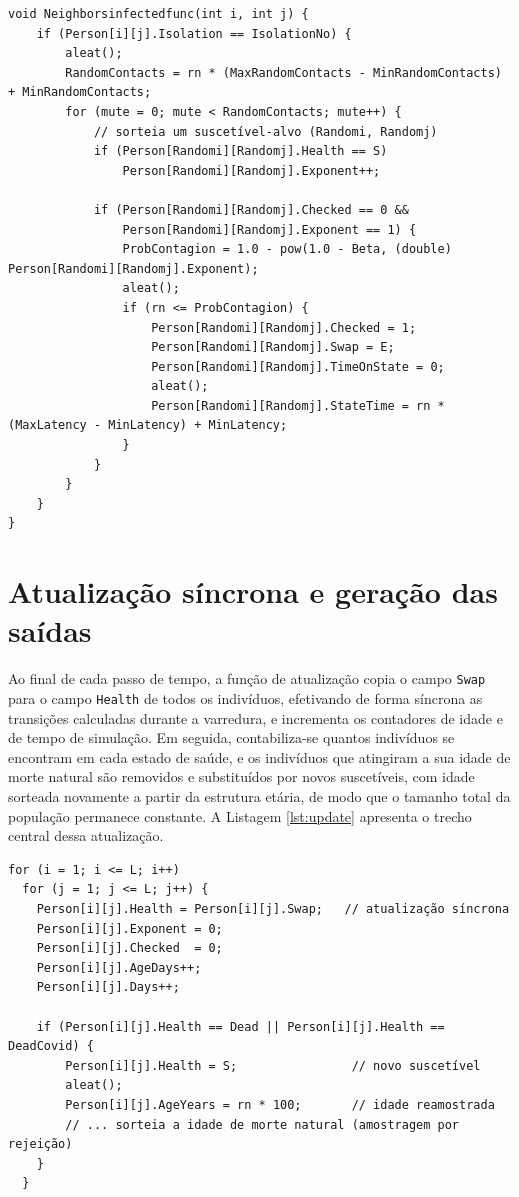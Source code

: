 \documentclass[
	12pt,				%
	openright,			%
	oneside,			%
	a4paper,			%
	english,			%
	french,				%
	spanish,			%
	brazil				%
	]{abntex2}
\begin{document}
\begin{lstlisting}[caption={Segundo mecanismo: o infectado busca suscetíveis (\texttt{Neighborsinfectedfunc}).}, label={lst:neighborsinf}]
void Neighborsinfectedfunc(int i, int j) {
    if (Person[i][j].Isolation == IsolationNo) {
        aleat();
        RandomContacts = rn * (MaxRandomContacts - MinRandomContacts) + MinRandomContacts;
        for (mute = 0; mute < RandomContacts; mute++) {
            // sorteia um suscetível-alvo (Randomi, Randomj)
            if (Person[Randomi][Randomj].Health == S)
                Person[Randomi][Randomj].Exponent++;

            if (Person[Randomi][Randomj].Checked == 0 &&
                Person[Randomi][Randomj].Exponent == 1) {
                ProbContagion = 1.0 - pow(1.0 - Beta, (double) Person[Randomi][Randomj].Exponent);
                aleat();
                if (rn <= ProbContagion) {
                    Person[Randomi][Randomj].Checked = 1;
                    Person[Randomi][Randomj].Swap = E;
                    Person[Randomi][Randomj].TimeOnState = 0;
                    aleat();
                    Person[Randomi][Randomj].StateTime = rn * (MaxLatency - MinLatency) + MinLatency;
                }
            }
        }
    }
}
\end{lstlisting}

\section{Atualização síncrona e geração das saídas}

Ao final de cada passo de tempo, a função de atualização copia o campo \texttt{Swap} para o campo \texttt{Health} de todos os indivíduos, efetivando de forma síncrona as transições calculadas durante a varredura, e incrementa os contadores de idade e de tempo de simulação. Em seguida, contabiliza-se quantos indivíduos se encontram em cada estado de saúde, e os indivíduos que atingiram a sua idade de morte natural são removidos e substituídos por novos suscetíveis, com idade sorteada novamente a partir da estrutura etária, de modo que o tamanho total da população permanece constante. A Listagem \ref{lst:update} apresenta o trecho central dessa atualização.

\begin{lstlisting}[caption={Atualização síncrona e substituição dos mortos (\texttt{Updatefunc}).}, label={lst:update}]
for (i = 1; i <= L; i++)
  for (j = 1; j <= L; j++) {
    Person[i][j].Health = Person[i][j].Swap;   // atualização síncrona
    Person[i][j].Exponent = 0;
    Person[i][j].Checked  = 0;
    Person[i][j].AgeDays++;
    Person[i][j].Days++;

    if (Person[i][j].Health == Dead || Person[i][j].Health == DeadCovid) {
        Person[i][j].Health = S;                // novo suscetível
        aleat();
        Person[i][j].AgeYears = rn * 100;       // idade reamostrada
        // ... sorteia a idade de morte natural (amostragem por rejeição)
    }
  }
\end{lstlisting}
\end{document}
